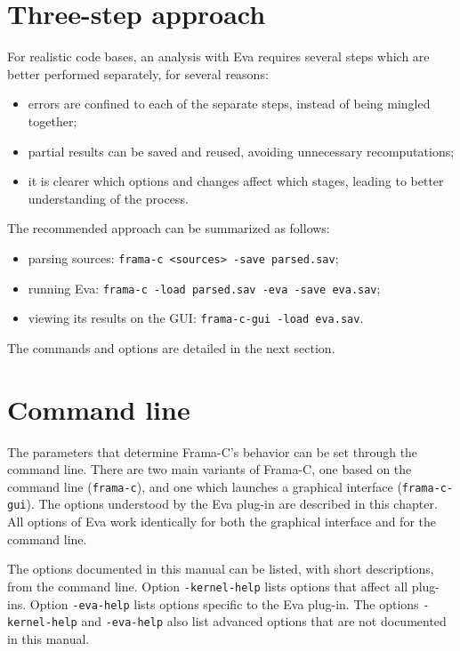 \documentclass[web]{frama-c-book}
\newcommand{\Eva}{\textsf{Eva}}
\begin{document}
\section{Three-step approach}
\label{three-step}

For realistic code bases, an analysis with \Eva{} requires several steps which
are better performed separately, for several reasons:

\begin{itemize}
\item errors are confined to each of the separate steps, instead of being
  mingled together;
\item partial results can be saved and reused, avoiding unnecessary
  recomputations;
\item it is clearer which options and changes affect which stages, leading to
  better understanding of the process.
\end{itemize}

The recommended approach can be summarized as follows:

\begin{itemize}
\item parsing sources: \verb|frama-c <sources> -save parsed.sav|;
\item running \Eva{}:  \verb|frama-c -load parsed.sav -eva -save eva.sav|;
\item viewing its results on the GUI: \verb|frama-c-gui -load eva.sav|.
\end{itemize}

The commands and options are detailed in the next section.

\section{Command line}
\label{command-line}

The parameters that determine Frama-C's behavior can be
set through the command line. There are two main variants of Frama-C,
one based on the command line (\lstinline|frama-c|), and one which launches
a graphical interface (\lstinline|frama-c-gui|).
The options understood by the \Eva{} plug-in are described in
this chapter.
All options of \Eva{} work identically for both the graphical interface
and for the command line.

\bigskip

The options documented in this manual can be listed,
with short descriptions, from the command line.
Option \lstinline|-kernel-help|
lists options that affect all plug-ins. Option
\lstinline|-eva-help| lists options specific to the
\Eva{} plug-in. The options \lstinline|-kernel-help| and
\lstinline|-eva-help| also list advanced options that are
not documented in this manual.
\end{document}
